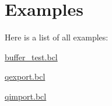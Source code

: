 \section{Examples}
Here is a list of all examples\+:\begin{DoxyCompactItemize}
\item 
\hyperlink{buffer_test_8bcl-example}{buffer\+\_\+test.\+bcl}
\item 
\hyperlink{qexport_8bcl-example}{qexport.\+bcl}
\item 
\hyperlink{qimport_8bcl-example}{qimport.\+bcl}
\end{DoxyCompactItemize}
